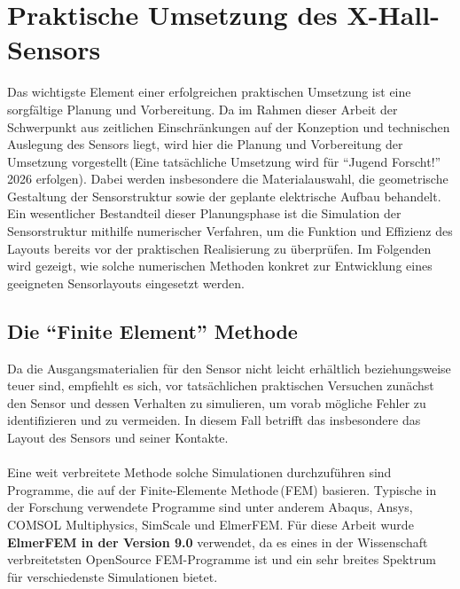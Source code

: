 \documentclass[12pt, a4paper]{article}
\begin{document}
\section{Praktische Umsetzung des X-Hall-Sensors}
Das wichtigste Element einer erfolgreichen praktischen Umsetzung ist eine sorgfältige Planung und Vorbereitung.\newline 
Da im Rahmen dieser Arbeit der Schwerpunkt aus zeitlichen Einschränkungen auf der Konzeption und technischen Auslegung des Sensors liegt, wird hier die Planung und Vorbereitung der Umsetzung vorgestellt\,(Eine tatsächliche Umsetzung wird für ``Jugend Forscht!'' 2026 erfolgen). Dabei werden insbesondere die Materialauswahl, die geometrische Gestaltung der Sensorstruktur sowie der geplante elektrische Aufbau behandelt.\newline
Ein wesentlicher Bestandteil dieser Planungsphase ist die Simulation der Sensorstruktur mithilfe numerischer Verfahren, um die Funktion und Effizienz des Layouts bereits vor der praktischen Realisierung zu überprüfen. Im Folgenden wird gezeigt, wie solche numerischen Methoden konkret zur Entwicklung eines geeigneten Sensorlayouts eingesetzt werden.

\subsection{Die ``Finite Element'' Methode}
Da die Ausgangsmaterialien für den Sensor nicht leicht erhältlich beziehungsweise teuer sind, empfiehlt es sich, vor tatsächlichen praktischen Versuchen zunächst den Sensor und dessen Verhalten zu simulieren, um vorab mögliche Fehler zu identifizieren und zu vermeiden. In diesem Fall betrifft das insbesondere das Layout des Sensors und seiner Kontakte.\paragraph{}

Eine weit verbreitete Methode solche Simulationen durchzuführen sind Programme, die auf der Finite-Elemente Methode\,(FEM) basieren. Typische in der Forschung verwendete Programme sind unter anderem Abaqus, Ansys, COMSOL Multiphysics, SimScale und ElmerFEM.\newline
Für diese Arbeit wurde \textbf{ElmerFEM in der Version 9.0} verwendet, da es eines in der Wissenschaft verbreitetsten OpenSource FEM-Programme ist und ein sehr breites Spektrum für verschiedenste Simulationen bietet.\paragraph{}
\end{document}
